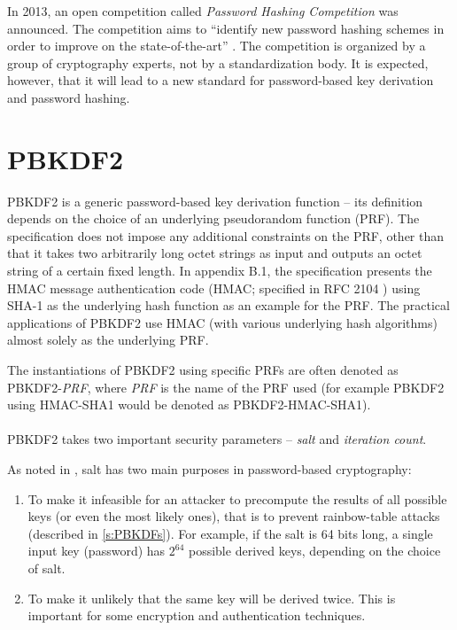 \documentclass[12pt,oneside]{fithesis2}
\begin{document}
      \label{p:phc}
      In 2013, an open competition called \emph{Password Hashing Competition} was announced. The competition aims to ``identify new password hashing schemes in order to improve on the state-of-the-art'' \cite{phc}. The competition is organized by a group of cryptography experts, not by a standardization body. It is expected, however, that it will lead to a new standard for password-based key derivation and password hashing.
      
      \section{PBKDF2}\label{s:PBKDF2}
      PBKDF2 is a generic password-based key derivation function -- its definition depends on the choice of an underlying pseudorandom function (PRF). The specification \cite{rfc2898} does not impose any additional constraints on the PRF, other than that it takes two arbitrarily long octet strings as input and outputs an octet string of a certain fixed length. In appendix B.1, the specification presents the HMAC message authentication code (HMAC; specified in RFC 2104 \cite{rfc2104}) using SHA-1 as the underlying hash function as an example for the PRF. The practical applications of PBKDF2 use HMAC (with various underlying hash algorithms) almost solely as the underlying PRF.
      
      The instantiations of PBKDF2 using specific PRFs are often denoted as PBKDF2-\emph{PRF}, where \emph{PRF} is the name of the PRF used (for example PBKDF2 using HMAC-SHA1 would be denoted as PBKDF2-HMAC-SHA1).
      
      \paragraph*{}
      PBKDF2 takes two important security parameters -- \emph{salt} and \emph{iteration count}.
      
      As noted in \cite[section 4.1]{rfc2898}, salt has two main purposes in password-based cryptography:
      \begin{enumerate}
        \item To make it infeasible for an attacker to precompute the results of all possible keys (or even the most likely ones), that is to prevent rainbow-table attacks (described in \ref{s:PBKDFs}). For example, if the salt is 64 bits long, a single input key (password) has $2^{64}$ possible derived keys, depending on the choice of salt.
        \item To make it unlikely that the same key will be derived twice. This is important for some encryption and authentication techniques.
      \end{enumerate}
      
\end{document}
